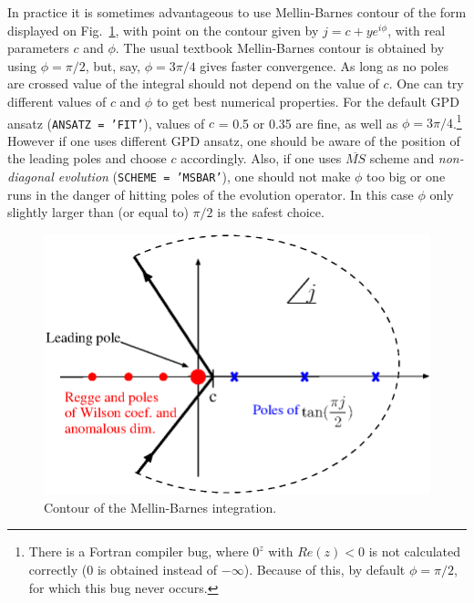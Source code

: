\documentclass[12pt]{article}
\begin{document}
In practice it is sometimes advantageous to use Mellin-Barnes contour of the form displayed
on Fig.~\ref{fig:MellinBarnes}, with point on the contour given
by $j=c+ye^{i\phi}$, with real parameters $c$ and $\phi$.
The usual textbook Mellin-Barnes contour is obtained by
using $\phi = \pi/2$, but, say, $\phi = 3\pi /4$ gives faster
convergence. As long as no poles are crossed value of the
integral should not depend on the value of $c$. One can
try different values of $c$ and $\phi$ to get best numerical
properties. 
For the default GPD ansatz (\texttt{ANSATZ = 'FIT'}), values of  $c$ = 0.5 or 0.35 are
fine, as well as $\phi = 3\pi/4$.\footnote{There is a Fortran compiler bug, where
$0^{z}$ with $Re(z)<0$ is not calculated correctly ($0$ is obtained instead of
$-\infty$). Because of this, by default $\phi = \pi/2$, for which this bug 
never occurs.}
However if one uses different GPD ansatz, one should
be aware of the position of the leading poles and choose $c$ accordingly. Also, if
one uses $\overline{MS}$ scheme and \emph{non-diagonal evolution} (\texttt{SCHEME = 'MSBAR'}),
one should not make $\phi$ too big or one runs in the danger of hitting poles of
the evolution operator. In this case $\phi$ only slightly larger than (or
equal to) $\pi/2$ is the safest choice.

\begin{figure}
\begin{center}
\includegraphics[scale=1.0]{MellinBarnes}
\end{center}
\caption{Contour of the Mellin-Barnes integration.}
\label{fig:MellinBarnes}
\end{figure}
\end{document}
